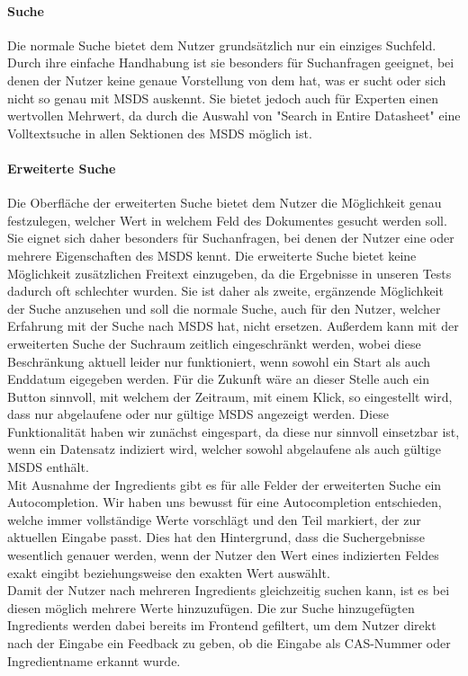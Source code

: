 \documentclass[oneside, a4paper, 12pt, titlepage]{article}
\begin{document}
\paragraph{Suche}
Die normale Suche bietet dem Nutzer grundsätzlich nur ein einziges Suchfeld. Durch ihre einfache Handhabung ist sie besonders für Suchanfragen geeignet, bei denen der Nutzer keine genaue Vorstellung von dem hat, was er sucht oder sich nicht so genau mit MSDS auskennt. Sie bietet jedoch auch für Experten einen wertvollen Mehrwert, da durch die Auswahl von "Search in Entire Datasheet" eine Volltextsuche in allen Sektionen des MSDS möglich ist.

\paragraph{Erweiterte Suche}
Die Oberfläche der erweiterten Suche bietet dem Nutzer die Möglichkeit genau festzulegen, welcher Wert in welchem Feld des Dokumentes gesucht werden soll. Sie eignet sich daher besonders für Suchanfragen, bei denen der Nutzer eine oder mehrere Eigenschaften des MSDS kennt. Die erweiterte Suche bietet keine Möglichkeit zusätzlichen Freitext einzugeben, da die Ergebnisse in unseren Tests dadurch oft schlechter wurden. Sie ist daher als zweite, ergänzende Möglichkeit der Suche anzusehen und soll die normale Suche, auch für den Nutzer, welcher Erfahrung mit der Suche nach MSDS hat, nicht ersetzen. Außerdem kann mit der erweiterten Suche der Suchraum zeitlich eingeschränkt werden, wobei diese Beschränkung aktuell leider nur funktioniert, wenn sowohl ein Start als auch Enddatum eigegeben werden. Für die Zukunft wäre an dieser Stelle auch ein Button sinnvoll, mit welchem der Zeitraum, mit einem Klick, so eingestellt wird, dass nur abgelaufene oder nur gültige MSDS angezeigt werden. Diese Funktionalität haben wir zunächst eingespart, da diese nur sinnvoll einsetzbar ist, wenn ein Datensatz indiziert wird, welcher sowohl abgelaufene als auch gültige MSDS enthält.\\
Mit Ausnahme der Ingredients gibt es für alle Felder der erweiterten Suche ein Autocompletion. Wir haben uns bewusst für eine Autocompletion entschieden, welche immer vollständige Werte vorschlägt und den Teil markiert, der zur aktuellen Eingabe passt. Dies hat den Hintergrund, dass die Suchergebnisse wesentlich genauer werden, wenn der Nutzer den Wert eines indizierten Feldes exakt eingibt beziehungsweise den exakten Wert auswählt.\\
Damit der Nutzer nach mehreren Ingredients gleichzeitig suchen kann, ist es bei diesen möglich mehrere Werte hinzuzufügen. Die zur Suche hinzugefügten Ingredients werden dabei bereits im Frontend gefiltert, um dem Nutzer direkt nach der Eingabe ein Feedback zu geben, ob die Eingabe als CAS-Nummer oder Ingredientname erkannt wurde.
\end{document}
